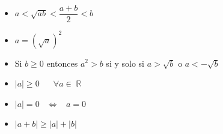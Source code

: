 \documentclass[12pt, fleqn]{report}                             %
\DeclareMathOperator \Space     {\quad}                         %
\DeclareMathOperator \MiniSpace {\;}                            %
\theoremstyle{break}                                            %
\newcommand \lEqual  {\MiniSpace \Leftrightarrow \MiniSpace}    %
\DeclareMathOperator \Reals        {\mathbb{R}}                 %
\begin{document}
            \begin{itemize}

                \item $a < \sqrt{ab} < \dfrac{a+b}{2} < b$

                \item $a = (\sqrt{a})^2$

                \item Si $b \geq 0$ entonces $a^2 > b$ si y solo si $a>\sqrt{b}$ o $a<-\sqrt{b}$

                \item $|a| \geq 0 \Space \forall a \in \Reals$

                \item $|a| = 0 \lEqual a = 0$

                \item $|a+b| \geq |a| + |b|$

            \end{itemize}

        
\end{document}
